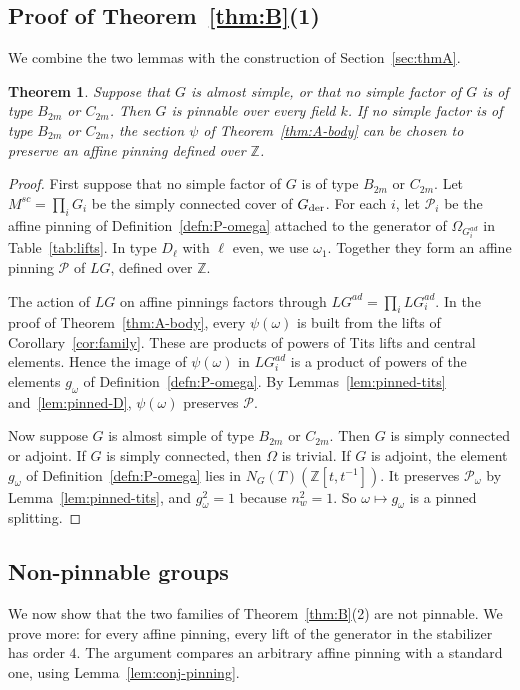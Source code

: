 \documentclass[psamsfonts]{amsart}
\newtheorem{thm}{Theorem}[section]
\theoremstyle{definition}
\theoremstyle{remark}
\numberwithin{equation}{section}
\newcommand{\Z}{\mathbb{Z}}   %
\newcommand\cP{\mathcal{P}}
\newcommand{\der}{\textup{der}}
\numberwithin{equation}{section}
\newcommand{\om}{\omega}
\newcommand{\Om}{\Omega}
\theoremstyle{plain}
\begin{document}
\subsection{Proof of Theorem~\ref{thm:B}(1)}
We combine the two lemmas with the construction of Section~\ref{sec:thmA}.

\begin{thm}\label{thm:B1-body}
Suppose that $G$ is almost simple, or that no simple factor of $G$ is of type $B_{2m}$ or $C_{2m}$. Then $G$ is pinnable over every field $k$. If no simple factor is of type $B_{2m}$ or $C_{2m}$, the section $\psi$ of Theorem~\ref{thm:A-body} can be chosen to preserve an affine pinning defined over $\Z$.
\end{thm}

\begin{proof}
First suppose that no simple factor of $G$ is of type $B_{2m}$ or $C_{2m}$. Let $M^{sc}=\prod_iG_i$ be the simply connected cover of $G_{\der}$. For each $i$, let $\cP_i$ be the affine pinning of Definition~\ref{defn:P-omega} attached to the generator of $\Om_{G_i^{ad}}$ in Table~\ref{tab:lifts}. In type $D_\ell$ with $\ell$ even, we use $\om_1$. Together they form an affine pinning $\cP$ of $LG$, defined over $\Z$.

The action of $LG$ on affine pinnings factors through $LG^{ad}=\prod_iLG_i^{ad}$. In the proof of Theorem~\ref{thm:A-body}, every $\psi(\om)$ is built from the lifts of Corollary~\ref{cor:family}. These are products of powers of Tits lifts and central elements. Hence the image of $\psi(\om)$ in $LG_i^{ad}$ is a product of powers of the elements $g_\om$ of Definition~\ref{defn:P-omega}. By Lemmas~\ref{lem:pinned-tits} and~\ref{lem:pinned-D}, $\psi(\om)$ preserves $\cP$.

Now suppose $G$ is almost simple of type $B_{2m}$ or $C_{2m}$. Then $G$ is simply connected or adjoint. If $G$ is simply connected, then $\Om$ is trivial. If $G$ is adjoint, the element $g_\om$ of Definition~\ref{defn:P-omega} lies in $N_G(T)(\Z[t,t^{-1}])$. It preserves $\cP_\om$ by Lemma~\ref{lem:pinned-tits}, and $g_\om^2=1$ because $n_w^2=1$. So $\om\mapsto g_\om$ is a pinned splitting.
\end{proof}

\subsection{Non-pinnable groups}
We now show that the two families of Theorem~\ref{thm:B}(2) are not pinnable. We prove more: for every affine pinning, every lift of the generator in the stabilizer has order $4$. The argument compares an arbitrary affine pinning with a standard one, using Lemma~\ref{lem:conj-pinning}.
\end{document}

